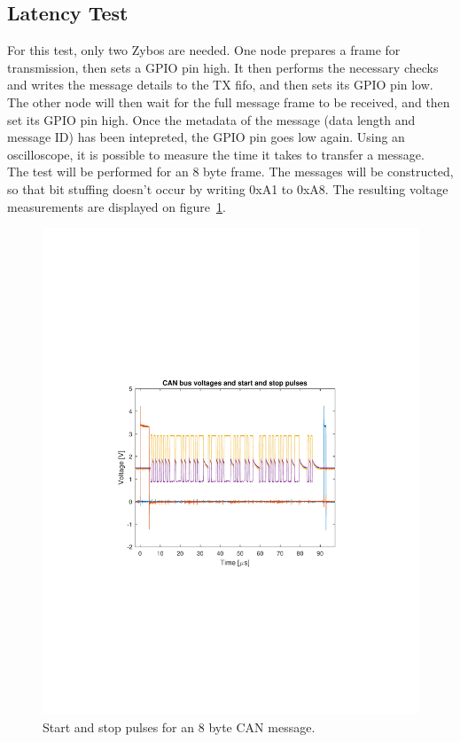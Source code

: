\subsection{Latency Test}\label{sub:CAN_latency}
For this test, only two Zybos are needed.
One node prepares a frame for transmission, then sets a GPIO pin high.
It then performs the necessary checks and writes the message details to the TX fifo, and then sets its GPIO pin low. \\

The other node will then wait for the full message frame to be received, and then set its GPIO pin high.
Once the metadata of the message (data length and message ID) has been intepreted, the GPIO pin goes low again.
Using an oscilloscope, it is possible to measure the time it takes to transfer a message.\\

The test will be performed for an 8 byte frame.
The messages will be constructed, so that bit stuffing doesn't occur by writing 0xA1 to 0xA8. 
The resulting voltage measurements are displayed on figure~\ref{fig:CAN_test1_raw}.\\

\begin{figure}[h]
	\centering
	\includegraphics[width = \linewidth]{graphics/CAN_test1_raw}
	\caption{Start and stop pulses for an 8 byte CAN message. }
	\label{fig:CAN_test1_raw}
\end{figure}

